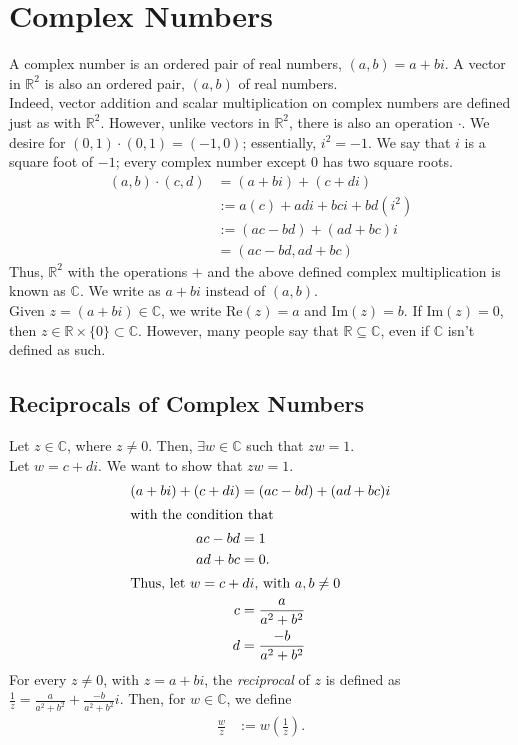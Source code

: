 \documentclass[10pt]{extarticle}
\title{}
\author{}
\date{}
\newcommand{\R}{\mathbb{R}}
\newcommand{\C}{\mathbb{C}}
\begin{document}
\section{Complex Numbers}%
  A complex number is an ordered pair of real numbers, $(a,b)=a+bi$. A vector in $\R^2$ is also an ordered pair, $(a,b)$ of real numbers.\\

  Indeed, vector addition and scalar multiplication on complex numbers are defined just as with $\R^2$. However, unlike vectors in $\R^2$, there is also an operation $\cdot$. We desire for $(0,1)\cdot (0,1) = (-1,0)$; essentially, $i^2 = -1$. We say that $i$ is a square foot of $-1$; every complex number except $0$ has two square roots.
  \begin{align*}
    (a,b)\cdot (c,d) &= (a+bi) + (c+di)\\
                     &:= a(c) + adi + bci + bd(i^2)\\
                     &:= (ac-bd) + (ad+bc)i\\
                     &= (ac-bd,ad+bc)
  \end{align*}
  Thus, $\R^2$ with the operations $+$ and the above defined complex multiplication is known as $\C$. We write as $a+bi$ instead of $(a,b)$.\\

  Given $z=(a+bi)\in \C$, we write $\text{Re}(z) = a$ and $\text{Im}(z) = b$. If $\text{Im}(z) = 0$, then $z\in \R\times\{0\} \subset \C$. However, many people say that $\R\subseteq \C$, even if $\C$ isn't defined as such.
  \subsection{Reciprocals of Complex Numbers}%
  Let $z\in \C$, where $z\neq 0$. Then, $\exists w\in \C$ such that $zw = 1$.\\

  Let $w = c+di$. We want to show that $zw = 1$.
  \begin{align*}
    (a+bi) + (c+di) &= (ac-bd) + (ad+bc)i\\
    \shortintertext{with the condition that}
    ac-bd &= 1\\
    ad + bc &= 0.\\
    \shortintertext{Thus, let $w = c+di$, with $a,b\neq 0$}
    c &= \frac{a}{a^2 + b^2}\\
    d &= \frac{-b}{a^2 + b^2}
  \end{align*}
  For every $z\neq 0$, with $z = a+bi$, the \textit{reciprocal} of $z$ is defined as $\frac{1}{z} = \frac{a}{a^2 + b^2} + \frac{-b}{a^2 + b^2}i$. Then, for $w\in \C$, we define
  \begin{align*}
    \frac{w}{z} &:= w \left(\frac{1}{z}\right).
  \end{align*}
\end{document}
